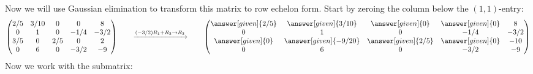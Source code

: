 \documentclass{ximera}
\begin{document}
\begin{example}
\begin{explanation}
Now we will use Gaussian elimination to transform this matrix to row echelon form. Start by zeroing the column below the $(1,1)$-entry:
\[
  \begin{pmatrix}
    {2/5}&  {3/10} & {0} &{0} &8 \\
    {0}&  {1} & {0} &{-1/4} & -3/2\\
    {3/5}&  {0} & {2/5} &{0} &2\\
    {0}&  {6} & {0} &{-3/2} &-9
  \end{pmatrix}
  \qquad\xrightarrow{(-3/2) R_1 + R_3\to R_3}\qquad
  \begin{pmatrix}
    \answer[given]{2/5}&  \answer[given]{3/10} & \answer[given]{0} &\answer[given]{0} &8 \\
    {0}&  {1} & {0} &{-1/4} & -3/2\\
    \answer[given]{0}&  \answer[given]{-9/20} & \answer[given]{2/5} &\answer[given]{0} &-10\\
    {0}&  {6} & {0} &{-3/2} &-9
  \end{pmatrix}
\]
Now we work with the submatrix:


\end{explanation}
\end{example}
\end{document}
